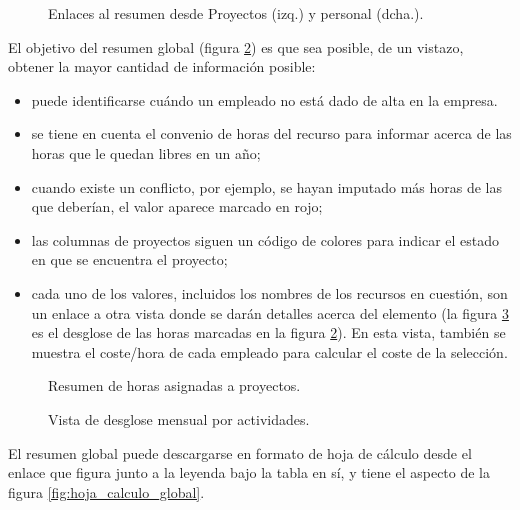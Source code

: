 \begin{figure}
\centering
{}
\caption{Enlaces al resumen desde Proyectos (izq.) y personal (dcha.).}
\label{fig:enlace_resumen_global_mont}
\end{figure}

El objetivo del resumen global (figura
\ref{fig:resumen_horas_asignadas_proyectos}) es que sea posible, de un vistazo,
obtener la mayor cantidad de información posible:

\begin{itemize}
\item puede identificarse cuándo un empleado no está dado de alta en la
empresa.

\item se tiene en cuenta el convenio de horas del recurso para informar acerca
de las horas que le quedan libres en un año;

\item cuando existe un conflicto, por ejemplo, se hayan imputado más horas
de las que deberían, el valor aparece marcado en rojo;

\item las columnas de proyectos siguen un código de colores para indicar el
estado en que se encuentra el proyecto;

\item cada uno de los valores, incluidos los nombres de los recursos en
cuestión, son un enlace a otra vista donde se darán detalles acerca
del elemento (la figura \ref{fig:desglose_mensual_actividades} es el desglose
de las horas marcadas en la figura \ref{fig:resumen_horas_asignadas_proyectos}).
En esta vista, también se muestra el coste/hora de
cada empleado para calcular el coste de la selección.
\end{itemize}

\begin{figure}
\centering
{}
\caption{Resumen de horas asignadas a proyectos.}
\label{fig:resumen_horas_asignadas_proyectos}
\end{figure}

\begin{figure}
\centering
{}
\caption{Vista de desglose mensual por actividades.}
\label{fig:desglose_mensual_actividades}
\end{figure}

El resumen global puede descargarse en formato de hoja de cálculo desde el
enlace que figura junto a la leyenda bajo la tabla en sí, y tiene el aspecto de
la figura \ref{fig:hoja_calculo_global}.

